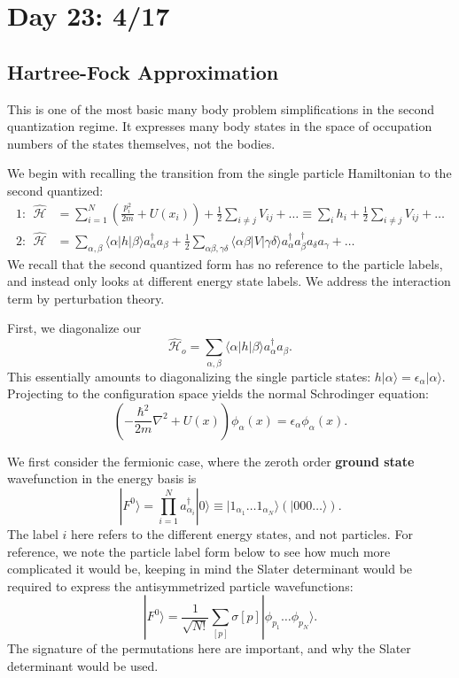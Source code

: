 \documentclass[fontsize=12pt]{scrartcl}
\newcommand{\la}{\langle}
\newcommand{\ra}{\rangle}
\newcommand{\Ham}{\hat{\mathcal{H}}}
\begin{document}
\section{Day 23: 4/17}

\subsection{Hartree-Fock Approximation}

This is one of the most basic many body problem simplifications in the second quantization regime. It expresses many body states in the space of occupation numbers of the states themselves, not the bodies.

We begin with recalling the transition from the single particle Hamiltonian to the second quantized: \begin{align*}
1: \ \ \Ham &= \sum_{i=1}^N \left(\frac{p_i^2}{2m}+U(x_i)\right) +\frac{1}{2}\sum_{i\neq j} V_{ij} + \dots \equiv \sum_i h_i + \frac{1}{2}\sum_{i\neq j} V_{ij}+\dots\\
2: \ \ \Ham &= \sum_{\alpha,\beta} \la \alpha|h|\beta\ra a^\dagger_{\alpha}a_\beta + \frac{1}{2} \sum_{\alpha\beta,\gamma\delta} \la \alpha\beta|V|\gamma\delta\ra a^\dagger_\alpha a^\dagger_\beta a_\delta a_\gamma + \dots
\end{align*} We recall that the second quantized form has no reference to the particle labels, and instead only looks at different energy state labels. We address the interaction term by perturbation theory.

First, we diagonalize our $$\Ham_o=\sum_{\alpha,\beta} \la \alpha|h|\beta\ra a^\dagger_{\alpha}a_\beta.$$ This essentially amounts to diagonalizing the single particle states: $h|\alpha\ra = \epsilon_\alpha |\alpha\ra$. Projecting to the configuration space yields the normal Schrodinger equation: $$\left(-\frac{\hbar^2}{2m}\nabla^2+U(x)\right)\phi_\alpha(x)=\epsilon_\alpha\phi_\alpha(x).$$

We first consider the fermionic case, where the zeroth order \textbf{ground state} wavefunction in the energy basis is $$|F^0\ra = \prod_{i=1}^{N}a^\dagger_{\alpha_i}|0\ra \equiv |1_{\alpha_1}\dots 1_{\alpha_N}\ra (|000\dots\ra).$$ The label $i$ here refers to the different energy states, and not particles. For reference, we note the particle label form below to see how much more complicated it would be, keeping in mind the Slater determinant would be required to express the antisymmetrized particle wavefunctions: $$|F^0\ra = \frac{1}{\sqrt{N!}} \sum_{[p]}\sigma[p]|\phi_{p_1}\dots\phi_{p_N}\ra.$$ The signature of the permutations here are important, and why the Slater determinant would be used.
\end{document}
